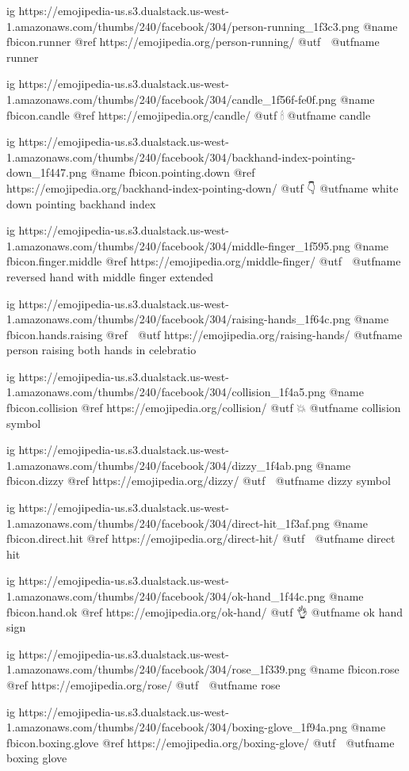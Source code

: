   ig https://emojipedia-us.s3.dualstack.us-west-1.amazonaws.com/thumbs/240/facebook/304/person-running_1f3c3.png
  @name fbicon.runner
  @ref https://emojipedia.org/person-running/
  @utf 🏃
  @utfname runner

  ig https://emojipedia-us.s3.dualstack.us-west-1.amazonaws.com/thumbs/240/facebook/304/candle_1f56f-fe0f.png
  @name fbicon.candle
  @ref https://emojipedia.org/candle/
  @utf 🕯
  @utfname candle

  ig https://emojipedia-us.s3.dualstack.us-west-1.amazonaws.com/thumbs/240/facebook/304/backhand-index-pointing-down_1f447.png
  @name fbicon.pointing.down
  @ref https://emojipedia.org/backhand-index-pointing-down/
  @utf 👇
  @utfname white down pointing backhand index

  ig https://emojipedia-us.s3.dualstack.us-west-1.amazonaws.com/thumbs/240/facebook/304/middle-finger_1f595.png
  @name fbicon.finger.middle
  @ref https://emojipedia.org/middle-finger/
  @utf 🖕
  @utfname reversed hand with middle finger extended

  ig https://emojipedia-us.s3.dualstack.us-west-1.amazonaws.com/thumbs/240/facebook/304/raising-hands_1f64c.png
  @name fbicon.hands.raising
  @ref 🙌
  @utf https://emojipedia.org/raising-hands/
  @utfname person raising both hands in celebratio

  ig https://emojipedia-us.s3.dualstack.us-west-1.amazonaws.com/thumbs/240/facebook/304/collision_1f4a5.png
  @name fbicon.collision
  @ref https://emojipedia.org/collision/
  @utf 💥
  @utfname collision symbol

  ig https://emojipedia-us.s3.dualstack.us-west-1.amazonaws.com/thumbs/240/facebook/304/dizzy_1f4ab.png
  @name fbicon.dizzy
  @ref https://emojipedia.org/dizzy/
  @utf 💫
  @utfname dizzy symbol

  ig https://emojipedia-us.s3.dualstack.us-west-1.amazonaws.com/thumbs/240/facebook/304/direct-hit_1f3af.png
  @name fbicon.direct.hit
  @ref https://emojipedia.org/direct-hit/
  @utf 🎯
  @utfname direct hit

  ig https://emojipedia-us.s3.dualstack.us-west-1.amazonaws.com/thumbs/240/facebook/304/ok-hand_1f44c.png
  @name fbicon.hand.ok
  @ref https://emojipedia.org/ok-hand/
  @utf 👌
  @utfname ok hand sign

  ig https://emojipedia-us.s3.dualstack.us-west-1.amazonaws.com/thumbs/240/facebook/304/rose_1f339.png
  @name fbicon.rose
  @ref https://emojipedia.org/rose/
  @utf 🌹
  @utfname rose

  ig https://emojipedia-us.s3.dualstack.us-west-1.amazonaws.com/thumbs/240/facebook/304/boxing-glove_1f94a.png
  @name fbicon.boxing.glove
  @ref https://emojipedia.org/boxing-glove/
  @utf 🥊
  @utfname boxing glove

